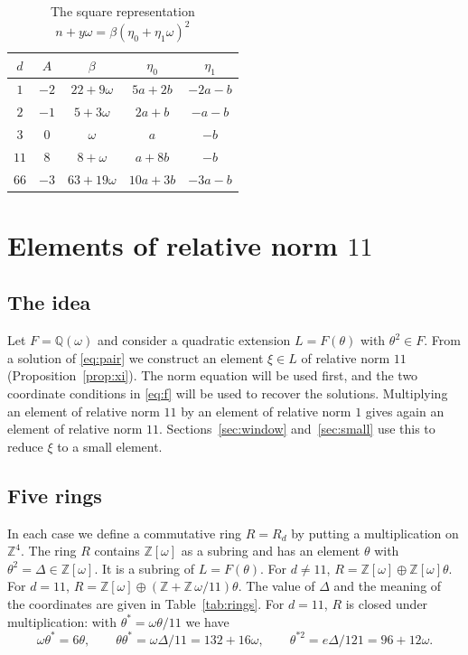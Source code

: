 \documentclass[a4paper,11pt]{article}
\theoremstyle{plain}
\theoremstyle{definition}
\theoremstyle{remark}
\numberwithin{equation}{section}
\numberwithin{table}{section}
\newcommand{\Z}{\mathbb{Z}}
\newcommand{\Q}{\mathbb{Q}}
\newcommand{\tsec}[2]{\texorpdfstring{#1}{#2}}
\begin{document}
\begin{table}[htbp]
\centering
\caption{The square representation $n+y\omega=\beta(\eta_0+\eta_1\omega)^2$}\label{tab:beta}
\begin{tabular}{ccccc}
\toprule
$d$ & $A$ & $\beta$ & $\eta_0$ & $\eta_1$\\
\midrule
$1$ & $-2$ & $22+9\omega$ & $5a+2b$ & $-2a-b$\\
$2$ & $-1$ & $5+3\omega$ & $2a+b$ & $-a-b$\\
$3$ & $0$ & $\omega$ & $a$ & $-b$\\
$11$ & $8$ & $8+\omega$ & $a+8b$ & $-b$\\
$66$ & $-3$ & $63+19\omega$ & $10a+3b$ & $-3a-b$\\
\bottomrule
\end{tabular}
\end{table}

\section{Elements of relative norm \tsec{$11$}{11}}\label{sec:norm11}

\subsection{The idea}

Let $F=\Q(\omega)$ and consider a quadratic extension $L=F(\theta)$ with $\theta^2\in F$.
From a solution of \eqref{eq:pair} we construct an element $\xi\in L$ of relative norm $11$ (Proposition~\ref{prop:xi}). The norm equation will be used first, and the two coordinate conditions in \eqref{eq:f} will be used to recover the solutions.
Multiplying an element of relative norm $11$ by an element of relative norm $1$ gives again an element of relative norm $11$.
Sections~\ref{sec:window} and~\ref{sec:small} use this to reduce $\xi$ to a small element.

\subsection{Five rings}

In each case we define a commutative ring $R=R_d$ by putting a multiplication on $\Z^4$.
The ring $R$ contains $\Z[\omega]$ as a subring and has an element $\theta$ with $\theta^2=\Delta\in\Z[\omega]$. It is a subring of $L=F(\theta)$.
For $d\ne11$, $R=\Z[\omega]\oplus\Z[\omega]\theta$. For $d=11$, $R=\Z[\omega]\oplus(\Z+\Z\,\omega/11)\theta$.
The value of $\Delta$ and the meaning of the coordinates are given in Table~\ref{tab:rings}.
For $d=11$, $R$ is closed under multiplication: with $\theta^*=\omega\theta/11$ we have
\[
\omega\theta^*=6\theta,\qquad\theta\theta^*=\omega\Delta/11=132+16\omega,\qquad\theta^{*2}=e\Delta/121=96+12\omega.
\]
\end{document}
